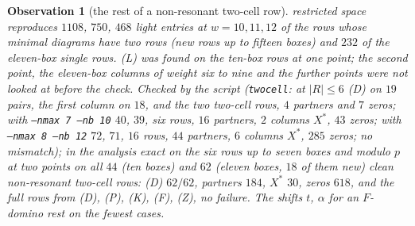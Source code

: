 \documentclass[11pt]{article}
\newtheorem{observation}{Observation}
\newcommand{\LMPH}[1]{\texttt{#1}}
\begin{document}
\begin{observation}[the rest of a non-resonant two-cell row]
restricted space reproduces $1108$, $750$, $468$ light entries at $w=10,11,12$ of the rows whose minimal diagrams have
two rows (new rows up to fifteen boxes) and $232$ of the eleven-box single rows.  (L) was found on the ten-box rows at one point; the second point, the eleven-box columns of weight six to nine
and the further points were not looked at before the check.  Checked by the script (\LMPH{twocell}: at $|R|\le6$ (D) on $19$ pairs, the first column on $18$, and the two
two-cell rows, $4$ partners and $7$ zeros; with \LMPH{--nmax 7 --nb 10} $40$, $39$, six rows, $16$ partners, $2$ columns
$X^*$, $43$ zeros; with \LMPH{--nmax 8 --nb 12} $72$, $71$, $16$ rows, $44$ partners, $6$ columns $X^*$, $285$ zeros; no
mismatch); in the analysis exact on the six rows up to seven boxes and modulo $p$ at two points on all $44$ (ten boxes)
and $62$ (eleven boxes, $18$ of them new) clean non-resonant two-cell rows: (D) $62/62$, partners $184$, $X^*$ $30$, zeros
$618$, and the full rows from (D), (P), (K), (F), (Z), no failure.  The shifts $t$, $\alpha$ for an $F$-domino rest on the
fewest cases.
\end{observation}
\end{document}
